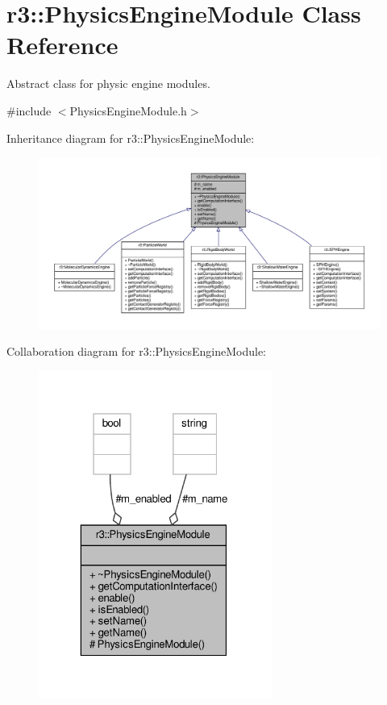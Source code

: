 \hypertarget{classr3_1_1_physics_engine_module}{}\section{r3\+:\+:Physics\+Engine\+Module Class Reference}
\label{classr3_1_1_physics_engine_module}


Abstract class for physic engine modules.  




{\ttfamily \#include $<$Physics\+Engine\+Module.\+h$>$}



Inheritance diagram for r3\+:\+:Physics\+Engine\+Module\+:\nopagebreak
\begin{figure}[H]
\begin{center}
\leavevmode
\includegraphics[width=350pt]{classr3_1_1_physics_engine_module__inherit__graph}
\end{center}
\end{figure}


Collaboration diagram for r3\+:\+:Physics\+Engine\+Module\+:\nopagebreak
\begin{figure}[H]
\begin{center}
\leavevmode
\includegraphics[width=217pt]{classr3_1_1_physics_engine_module__coll__graph}
\end{center}
\end{figure}
